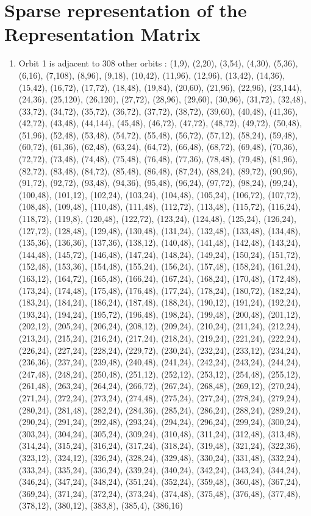\documentclass[12pt]{article}
\begin{document}
\section{Sparse representation of the Representation Matrix}
\begin{enumerate}
\item Orbit 1 is adjacent to 308 other orbits : (1,9), (2,20), (3,54), (4,30), (5,36), (6,16), (7,108), (8,96), (9,18), (10,42), (11,96), (12,96), (13,42), (14,36), (15,42), (16,72), (17,72), (18,48), (19,84), (20,60), (21,96), (22,96), (23,144), (24,36), (25,120), (26,120), (27,72), (28,96), (29,60), (30,96), (31,72), (32,48), (33,72), (34,72), (35,72), (36,72), (37,72), (38,72), (39,60), (40,48), (41,36), (42,72), (43,48), (44,144), (45,48), (46,72), (47,72), (48,72), (49,72), (50,48), (51,96), (52,48), (53,48), (54,72), (55,48), (56,72), (57,12), (58,24), (59,48), (60,72), (61,36), (62,48), (63,24), (64,72), (66,48), (68,72), (69,48), (70,36), (72,72), (73,48), (74,48), (75,48), (76,48), (77,36), (78,48), (79,48), (81,96), (82,72), (83,48), (84,72), (85,48), (86,48), (87,24), (88,24), (89,72), (90,96), (91,72), (92,72), (93,48), (94,36), (95,48), (96,24), (97,72), (98,24), (99,24), (100,48), (101,12), (102,24), (103,24), (104,48), (105,24), (106,72), (107,72), (108,48), (109,48), (110,48), (111,48), (112,72), (113,48), (115,72), (116,24), (118,72), (119,8), (120,48), (122,72), (123,24), (124,48), (125,24), (126,24), (127,72), (128,48), (129,48), (130,48), (131,24), (132,48), (133,48), (134,48), (135,36), (136,36), (137,36), (138,12), (140,48), (141,48), (142,48), (143,24), (144,48), (145,72), (146,48), (147,24), (148,24), (149,24), (150,24), (151,72), (152,48), (153,36), (154,48), (155,24), (156,24), (157,48), (158,24), (161,24), (163,12), (164,72), (165,48), (166,24), (167,24), (168,24), (170,48), (172,48), (173,24), (174,48), (175,48), (176,48), (177,24), (178,24), (180,72), (182,24), (183,24), (184,24), (186,24), (187,48), (188,24), (190,12), (191,24), (192,24), (193,24), (194,24), (195,72), (196,48), (198,24), (199,48), (200,48), (201,12), (202,12), (205,24), (206,24), (208,12), (209,24), (210,24), (211,24), (212,24), (213,24), (215,24), (216,24), (217,24), (218,24), (219,24), (221,24), (222,24), (226,24), (227,24), (228,24), (229,72), (230,24), (232,24), (233,12), (234,24), (236,36), (237,24), (239,48), (240,48), (241,24), (242,24), (243,24), (244,24), (247,48), (248,24), (250,48), (251,12), (252,12), (253,12), (254,48), (255,12), (261,48), (263,24), (264,24), (266,72), (267,24), (268,48), (269,12), (270,24), (271,24), (272,24), (273,24), (274,48), (275,24), (277,24), (278,24), (279,24), (280,24), (281,48), (282,24), (284,36), (285,24), (286,24), (288,24), (289,24), (290,24), (291,24), (292,48), (293,24), (294,24), (296,24), (299,24), (300,24), (303,24), (304,24), (305,24), (309,24), (310,48), (311,24), (312,48), (313,48), (314,24), (315,24), (316,24), (317,24), (318,24), (319,48), (321,24), (322,36), (323,12), (324,12), (326,24), (328,24), (329,48), (330,24), (331,48), (332,24), (333,24), (335,24), (336,24), (339,24), (340,24), (342,24), (343,24), (344,24), (346,24), (347,24), (348,24), (351,24), (352,24), (359,48), (360,48), (367,24), (369,24), (371,24), (372,24), (373,24), (374,48), (375,48), (376,48), (377,48), (378,12), (380,12), (383,8), (385,4), (386,16)

\end{enumerate}
\end{document}
